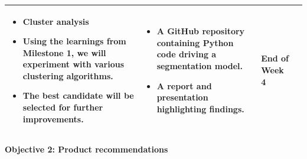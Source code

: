 \documentclass[
]{book}
\providecommand{\tightlist}{%
  \setlength{\itemsep}{0pt}\setlength{\parskip}{0pt}}
\begin{document}
\begin{longtable}[]{@{}llll@{}}
\begin{minipage}[t]{0.30\columnwidth}
\begin{itemize}
\tightlist
\item
  \textbf{Cluster analysis}
\item
  Using the learnings
  from Milestone 1, we
  will experiment with
  various clustering
  algorithms.
\item
  The best candidate
  will be selected for
  further improvements.
\end{itemize}\strut
\end{minipage} & \begin{minipage}[t]{0.30\columnwidth}\raggedright
\begin{itemize}
\tightlist
\item
  A GitHub repository
  containing Python code
  driving a segmentation
  model.
\item
  A report and
  presentation
  highlighting findings.
\end{itemize}\strut
\end{minipage} & \begin{minipage}[t]{0.15\columnwidth}\raggedright
End
of
Week
4\strut
\end{minipage}\tabularnewline
\bottomrule
\end{longtable}

\textbf{Objective 2: Product recommendations}
\end{document}
